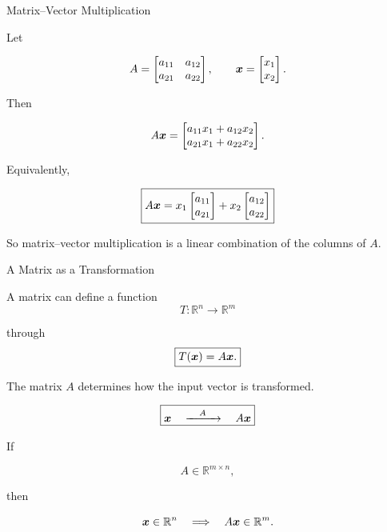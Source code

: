 \begin{frame}{Matrix--Vector Multiplication}

Let

\[
A=
\begin{bmatrix}
a_{11} & a_{12}\\
a_{21} & a_{22}
\end{bmatrix},
\qquad
\bm{x}
=
\begin{bmatrix}
x_1\\
x_2
\end{bmatrix}.
\]

Then

\[
A\bm{x}
=
\begin{bmatrix}
a_{11}x_1+a_{12}x_2\\
a_{21}x_1+a_{22}x_2
\end{bmatrix}.
\]

\vspace{0.4cm}

Equivalently,

\[
\boxed{
A\bm{x}
=
x_1
\begin{bmatrix}
a_{11}\\
a_{21}
\end{bmatrix}
+
x_2
\begin{bmatrix}
a_{12}\\
a_{22}
\end{bmatrix}
}
\]

So matrix--vector multiplication is a linear combination
of the columns of $A$.

\end{frame}



\begin{frame}{A Matrix as a Transformation}

A matrix can define a function
\vspace{-0.1cm}
\[
T:\mathbb{R}^n\rightarrow\mathbb{R}^m
\]

through
\[
\boxed{
T(\bm{x})=A\bm{x}.
}
\]

The matrix $A$ determines how the input vector is transformed.

\[
\boxed{
\bm{x}
\quad\xrightarrow{\quad A\quad}\quad
A\bm{x}
}
\]

If

\[
A\in\mathbb{R}^{m\times n},
\]

then

\[
\bm{x}\in\mathbb{R}^n
\quad\Longrightarrow\quad
A\bm{x}\in\mathbb{R}^m.
\]

\end{frame}


